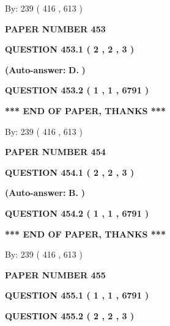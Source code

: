 \documentclass[12pt]{article}
\begin{document}
   
\hspace{1.0in} By: 
 239 ( 416 ,  613 )
   
   
   
   
\newpage 
\setcounter{page}{ 
   453001 } 
   
   
 {\textbf{ \Large{ PAPER NUMBER  453  }}}
   
   
   
   
  
  
{\textbf{\large{QUESTION
453.1 
 ( 2 , 2 , 3 )
}}}
 
 
{\textbf{(Auto-answer:}}
{\textbf{\large{
D.}}}
{\textbf{)}}
 
 
  
  
{\textbf{\large{QUESTION
453.2 
 ( 1 , 1 , 6791 )
}}}
   
   
   
   
\vspace{1.0in} 
{\textbf{\large{ *** END OF PAPER, THANKS *** }}} 
   
   
\hspace{1.0in} By: 
 239 ( 416 ,  613 )
   
   
   
   
\newpage 
\setcounter{page}{ 
   454001 } 
   
   
 {\textbf{ \Large{ PAPER NUMBER  454  }}}
   
   
   
   
  
  
{\textbf{\large{QUESTION
454.1 
 ( 2 , 2 , 3 )
}}}
 
 
{\textbf{(Auto-answer:}}
{\textbf{\large{
B.}}}
{\textbf{)}}
 
 
  
  
{\textbf{\large{QUESTION
454.2 
 ( 1 , 1 , 6791 )
}}}
   
   
   
   
\vspace{1.0in} 
{\textbf{\large{ *** END OF PAPER, THANKS *** }}} 
   
   
\hspace{1.0in} By: 
 239 ( 416 ,  613 )
   
   
   
   
\newpage 
\setcounter{page}{ 
   455001 } 
   
   
 {\textbf{ \Large{ PAPER NUMBER  455  }}}
   
   
   
   
  
  
{\textbf{\large{QUESTION
455.1 
 ( 1 , 1 , 6791 )
}}}
  
  
{\textbf{\large{QUESTION
455.2 
 ( 2 , 2 , 3 )
}}}
 
\end{document}
